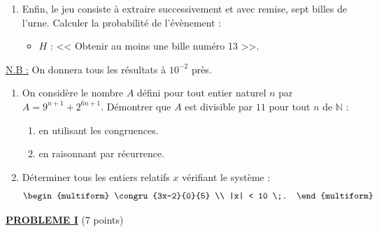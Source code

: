 \begin{description}
\begin{enumerate}
\begin{itemize}
                              \end{itemize}
                        \item Enfin, le jeu consiste \`a extraire successivement et avec remise, sept billes de l'urne.
                              Calculer la probabilit\'e de l'\'ev\`enement :
                              \begin{itemize}
                                    \item $H$ : << Obtenir au moins une bille num\'ero 13 >>.
                              \end{itemize}
                  \end{enumerate}
                  \begin{center}
                        \underline{N.B :} On donnera tous les r\'esultats \`a $10^{-2}$ pr\`es.
                  \end{center}
            \item[B- Arithm\'etique]
                  \begin{enumerate}
                        \item On consid\`ere le nombre $A$ d\'efini pour tout entier naturel $n$ par $A = 9^{n+1} + 2^{6n+1}$.
                              D\'emontrer que $A$ est divisible par $11$ pour tout $n$ de $\mathbb{N}$ :
                              \begin{enumerate}
                                    \item en utilisant les congruences.
                                    \item en raisonnant par r\'ecurrence.
                              \end{enumerate}
                        \item D\'eterminer tous les entiers relatifs $x$ v\'erifiant le syst\`eme :
                              \[
                                    \begin{multiform}
                                          \congru{3x-2}{0}{5} \\
                                          |x| < 10 \;.
                                    \end{multiform}
                              \]
                  \end{enumerate}
      \end{description}
\noindent \underline{\textsc{\textbf{PROBLEME I}}} (7 points) 
